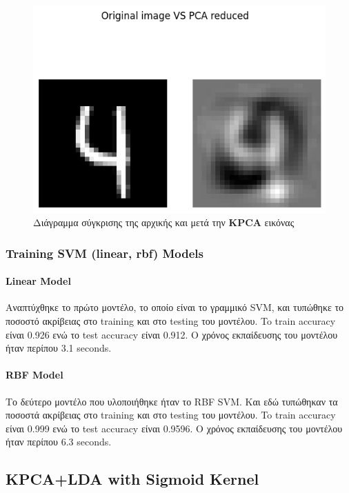 \begin{figure}[ht]
	\centering
	\includegraphics[width=1\linewidth]{Images data1/kpcavsoriginal1.png}
	\caption{ Διάγραμμα σύγκρισης της αρχικής και μετά την \textbf{KPCA} εικόνας}
	\label{f:g4}	
\end{figure}

\subsubsection{Training SVM (linear, rbf) Models}

\paragraph{Linear Model}

Αναπτύχθηκε το πρώτο μοντέλο, το οποίο είναι το γραμμικό SVM, και
τυπώθηκε το ποσοστό ακρίβειας στο training και στο testing του μοντέλου. To train accuracy είναι 0.926 ενώ το test
accuracy είναι 0.912. Ο χρόνος εκπαίδευσης του μοντέλου ήταν περίπου 3.1 seconds.

\paragraph{RBF Model}

Το δεύτερο μοντέλο που υλοποιήθηκε ήταν το RBF SVM. Και εδώ τυπώθηκαν τα ποσοστά
ακρίβειας στο training και στο testing του μοντέλου. To train accuracy είναι 0.999 ενώ το test accuracy είναι 0.9596. Ο χρόνος εκπαίδευσης του μοντέλου ήταν περίπου 6.3 seconds.
\newpage

\subsection{KPCA+LDA with Sigmoid Kernel}

